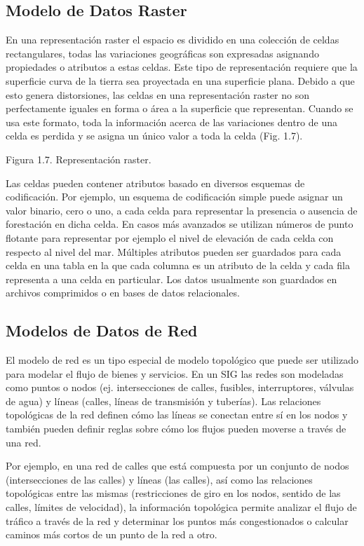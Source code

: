 \documentclass[final,fmstyle]{fpunathesis}
\begin{document}
\subsection{Modelo de Datos Raster}

En una representación raster el espacio es dividido en una colección de celdas rectangulares, todas las variaciones geográficas son expresadas asignando propiedades o atributos a estas celdas. Este tipo de representación requiere que la superficie curva de la tierra sea proyectada en una superficie plana. Debido a que esto genera distorsiones, las celdas en una representación raster no son perfectamente iguales en forma o área a la superficie que representan. Cuando se usa este formato, toda la información acerca de las variaciones dentro de una celda es perdida y se asigna un único valor a toda la celda (Fig. 1.7).

Figura 1.7. Representación raster.

Las celdas pueden contener atributos basado en diversos esquemas de codificación. Por ejemplo, un esquema de codificación simple puede asignar un valor binario, cero o uno, a cada celda para representar la presencia o ausencia de forestación en dicha celda. En casos más avanzados se utilizan números de punto flotante para representar por ejemplo el nivel de elevación de cada celda con respecto al nivel del mar. Múltiples atributos pueden ser guardados para cada celda en una tabla en la que cada columna es un atributo de la celda y cada fila representa a una celda en particular. Los datos usualmente son guardados en archivos comprimidos o en bases de datos relacionales.

\subsection{Modelos de Datos de Red}

El modelo de red es un tipo especial de modelo topológico que puede ser utilizado para modelar el flujo de bienes y servicios. En un SIG las redes son modeladas como puntos o nodos (ej. intersecciones de calles, fusibles, interruptores, válvulas de agua) y líneas  (calles, líneas de transmisión y tuberías).  Las relaciones topológicas de la red definen  cómo las líneas se conectan entre sí en los nodos y también pueden definir reglas sobre cómo los flujos pueden moverse a través de una red.

Por ejemplo, en una red de calles que está compuesta por un conjunto de nodos (intersecciones de las calles) y líneas (las calles), así como las relaciones topológicas entre las mismas (restricciones de giro en los nodos, sentido de las calles, límites de velocidad), la información topológica permite analizar el flujo de tráfico a través de la red y determinar los puntos más congestionados o calcular caminos más cortos de un punto de la red a otro.
\end{document}
